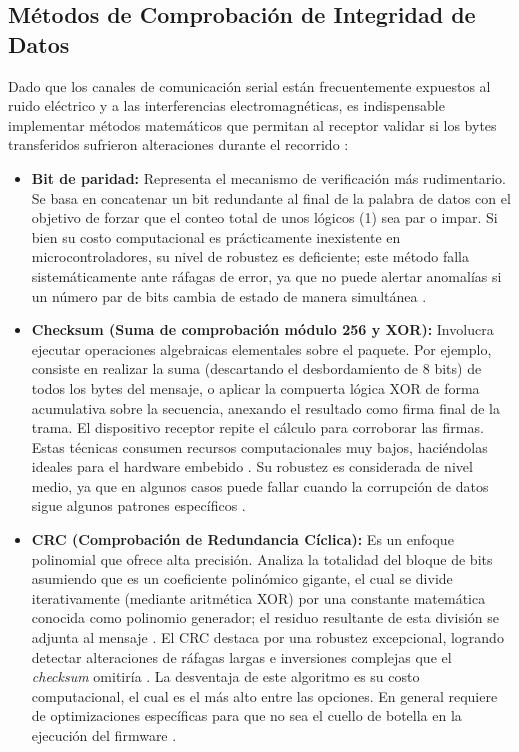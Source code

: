 \documentclass[journal]{IEEEtran}
\begin{document}
\subsection{Métodos de Comprobación de Integridad de Datos}
Dado que los canales de comunicación serial están frecuentemente expuestos al ruido eléctrico y a las interferencias electromagnéticas, es indispensable implementar métodos matemáticos que permitan al receptor validar si los bytes transferidos sufrieron alteraciones durante el recorrido \cite{tanenbaum2012}:
\begin{itemize}
    \item \textbf{Bit de paridad:} Representa el mecanismo de verificación más rudimentario. Se basa en concatenar un bit redundante al final de la palabra de datos con el objetivo de forzar que el conteo total de unos lógicos (1) sea par o impar. Si bien su costo computacional es prácticamente inexistente en microcontroladores, su nivel de robustez es deficiente; este método falla sistemáticamente ante ráfagas de error, ya que no puede alertar anomalías si un número par de bits cambia de estado de manera simultánea \cite{stallings2004}.
    
    \item \textbf{Checksum (Suma de comprobación módulo 256 y XOR):} Involucra ejecutar operaciones algebraicas elementales sobre el paquete. Por ejemplo, consiste en realizar la suma (descartando el desbordamiento de 8 bits) de todos los bytes del mensaje, o aplicar la compuerta lógica XOR de forma acumulativa sobre la secuencia, anexando el resultado como firma final de la trama. El dispositivo receptor repite el cálculo para corroborar las firmas. Estas técnicas consumen recursos computacionales muy bajos, haciéndolas ideales para el hardware embebido \cite{stallings2004}. Su robustez es considerada de nivel medio, ya que en algunos casos puede fallar cuando la corrupción de datos sigue algunos patrones específicos \cite{tanenbaum2012}.
    
    \item \textbf{CRC (Comprobación de Redundancia Cíclica):} Es un enfoque polinomial que ofrece alta precisión. Analiza la totalidad del bloque de bits asumiendo que es un coeficiente polinómico gigante, el cual se divide iterativamente (mediante aritmética XOR) por una constante matemática conocida como polinomio generador; el residuo resultante de esta división se adjunta al mensaje \cite{tanenbaum2012}. El CRC destaca por una robustez excepcional, logrando detectar alteraciones de ráfagas largas e inversiones complejas que el \textit{checksum} omitiría \cite{stallings2004}. La desventaja de este algoritmo es su costo computacional, el cual es el más alto entre las opciones. En general requiere de optimizaciones específicas para que no sea el cuello de botella en la ejecución del firmware \cite{tanenbaum2012}.
\end{itemize}
\end{document}
